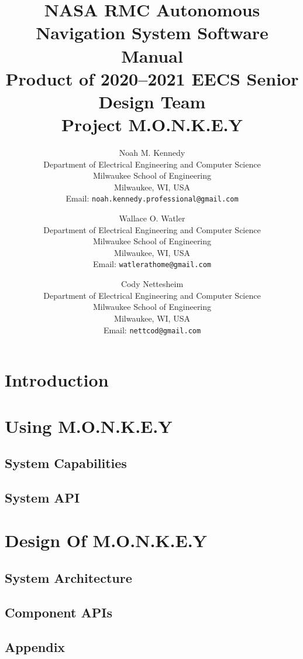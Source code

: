 \documentclass[8pt]{report}
\title{
    NASA RMC Autonomous Navigation System Software Manual \\
    Product of 2020--2021 EECS Senior Design Team \\
    Project M.O.N.K.E.Y
}
\author{
    Noah M. Kennedy \\[3pt]
    {\small Department of Electrical Engineering and Computer Science} \\
    {\small Milwaukee School of Engineering} \\
    {\small Milwaukee, WI, USA} \\
    {\small Email: {\texttt{noah.kennedy.professional@gmail.com} }} \\[12pt]
    \and
    Wallace O. Watler \\[3pt]
    {\small Department of Electrical Engineering and Computer Science} \\
    {\small Milwaukee School of Engineering} \\
    {\small Milwaukee, WI, USA} \\
    {\small Email: {\texttt{watlerathome@gmail.com} }} \\[12pt]
    \and
    Cody Nettesheim \\[3pt]
    {\small Department of Electrical Engineering and Computer Science} \\
    {\small Milwaukee School of Engineering} \\
    {\small Milwaukee, WI, USA} \\
    {\small Email: {\texttt{nettcod@gmail.com} }} \\[12pt]
}
\begin{document}
    \maketitle
    \newpage


    \tableofcontents
    \newpage


    \chapter{Introduction}\label{ch:introduction}
    
    \newpage


    \chapter{Using M.O.N.K.E.Y}\label{ch:using-monkey}
    \newpage


    \section{System Capabilities}\label{sec:system-capabilities}
    \newpage


    \section{System API}\label{sec:system-api}
    
    \newpage


    \chapter{Design Of M.O.N.K.E.Y}\label{ch:design-of-monkey}
    \newpage


    \section{System Architecture}\label{sec:system-architecture}
    
    \newpage


    \section{Component APIs}\label{sec:components}
    
    \newpage

    \section*{Appendix}\label{sec:appendix}
    
    \newpage

    \printbibliography
\end{document}
